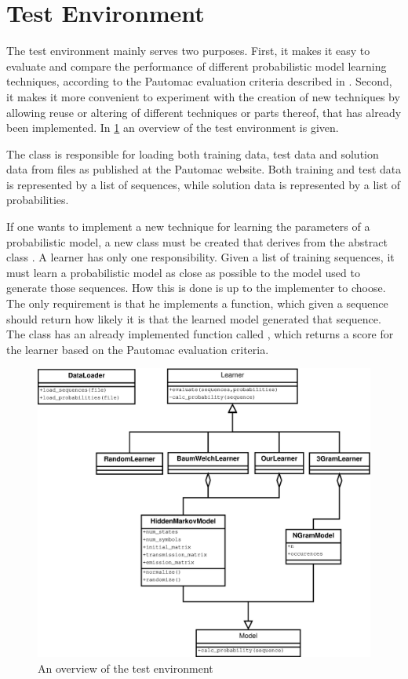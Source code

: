 \section{Test Environment}

The test environment mainly serves two purposes. First, it makes it easy to evaluate and compare the performance of different probabilistic model learning techniques, according to the Pautomac evaluation criteria described in .
Second, it makes it more convenient to experiment with the creation of new techniques by allowing reuse or altering of different techniques or parts thereof, that has already been implemented. In \ref{fig:testenvironment} an overview of the test environment is given.

The  class is responsible for loading both training data, test data and solution data from files as published at the Pautomac website. Both training and test data is represented by a list of sequences, while solution data is represented by a list of probabilities.

If one wants to implement a new technique for learning the parameters of a probabilistic model, a new class must be created that derives from the abstract class . A learner has only one responsibility. Given a list of training sequences, it must learn a probabilistic model as close as possible to the model used to generate those sequences. How this is done is up to the implementer to choose. The only requirement is that he implements a  function, which given a sequence should return how likely it is that the learned model generated that sequence.
The  class has an already implemented function called , which returns a score for the learner based on the Pautomac evaluation criteria.

\begin{figure}[!htb]
\centering
\includegraphics[scale=.4]{pictures/test-environment-overview.eps}
\caption{An overview of the test environment}
\label{fig:testenvironment}
\end{figure}

